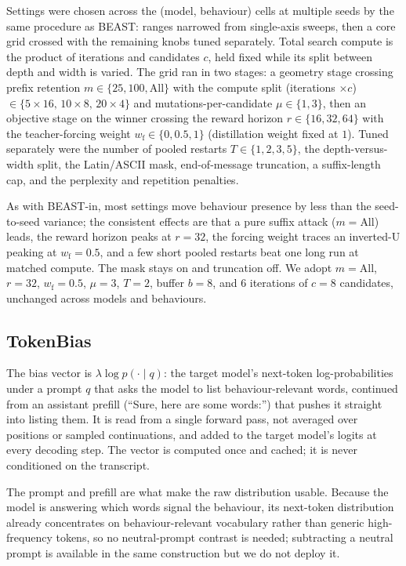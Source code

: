 \documentclass{article}
\theoremstyle{plain}
\theoremstyle{definition}
\theoremstyle{remark}
\begin{document}
Settings were chosen across the (model, behaviour) cells at multiple seeds by the same procedure as BEAST: ranges narrowed from single-axis sweeps, then a core grid crossed with the remaining knobs tuned separately. Total search compute is the product of iterations and candidates $c$, held fixed while its split between depth and width is varied. The grid ran in two stages: a geometry stage crossing prefix retention $m \in \{25, 100, \text{All}\}$ with the compute split (iterations $\times c$) $\in \{5\times16,\,10\times8,\,20\times4\}$ and mutations-per-candidate $\mu \in \{1, 3\}$, then an objective stage on the winner crossing the reward horizon $r \in \{16, 32, 64\}$ with the teacher-forcing weight $w_{\mathrm f} \in \{0, 0.5, 1\}$ (distillation weight fixed at $1$). Tuned separately were the number of pooled restarts $T \in \{1, 2, 3, 5\}$, the depth-versus-width split, the Latin/ASCII mask, end-of-message truncation, a suffix-length cap, and the perplexity and repetition penalties.

As with BEAST-in, most settings move behaviour presence by less than the seed-to-seed variance; the consistent effects are that a pure suffix attack ($m = \text{All}$) leads, the reward horizon peaks at $r = 32$, the forcing weight traces an inverted-U peaking at $w_{\mathrm f} = 0.5$, and a few short pooled restarts beat one long run at matched compute. The mask stays on and truncation off. We adopt $m = \text{All}$, $r = 32$, $w_{\mathrm f} = 0.5$, $\mu = 3$, $T = 2$, buffer $b = 8$, and $6$ iterations of $c = 8$ candidates, unchanged across models and behaviours.

\subsection{TokenBias}
The bias vector is $\lambda \log p(\cdot \mid q)$: the target model's next-token log-probabilities under a prompt $q$ that asks the model to list behaviour-relevant words, continued from an assistant prefill (``Sure, here are some words:'') that pushes it straight into listing them. It is read from a single forward pass, not averaged over positions or sampled continuations, and added to the target model's logits at every decoding step. The vector is computed once and cached; it is never conditioned on the transcript.

The prompt and prefill are what make the raw distribution usable. Because the model is answering which words signal the behaviour, its next-token distribution already concentrates on behaviour-relevant vocabulary rather than generic high-frequency tokens, so no neutral-prompt contrast is needed; subtracting a neutral prompt is available in the same construction but we do not deploy it.
\end{document}
